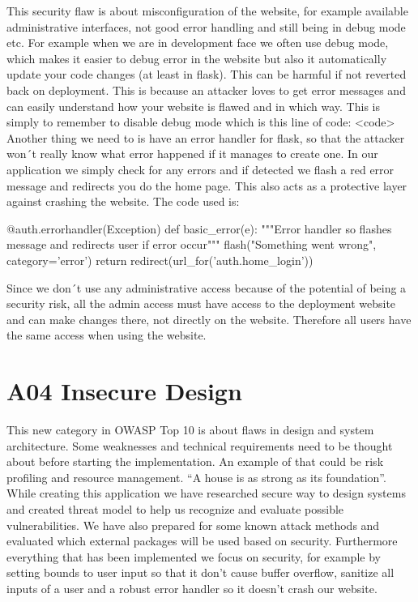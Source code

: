 This security flaw is about misconfiguration of the website, for example available administrative interfaces, not good error handling and still being in debug mode etc.
For example when we are in development face we often use debug mode, which makes it easier to debug error in the website but also it automatically update your code changes (at least in flask). This can be harmful if not reverted back on deployment. This is because an attacker loves to get error messages and can easily understand how your website is flawed and in which way.  This is simply to remember to disable debug mode which is this line of code: <code>
Another thing we need to is have an error handler for flask, so that the attacker won´t really know what error happened if it manages to create one. In our application we simply check for any errors and if detected we flash a red error message and redirects you do the home page. This also acts as a protective layer against crashing the website. The code used is:

\begin{python}
@auth.errorhandler(Exception)
def basic_error(e):
    """Error handler so flashes message
    and redirects user if error occur"""
    flash("Something went wrong", category='error')
    return redirect(url_for('auth.home_login'))
\end{python}

Since we don´t use any administrative access because of the potential of being a security risk, all the admin access must have access to the deployment website and can make changes there, not directly on the website. Therefore all users have the same access when using the website.

\section{A04 Insecure Design}

This new category in OWASP Top 10 is about flaws in design and system architecture. Some weaknesses and technical requirements need to be thought about before starting the implementation. An example of that could be risk profiling and resource management. “A house is as strong as its foundation”. 
While creating this application we have researched secure way to design systems and created threat model to help us recognize and evaluate possible vulnerabilities. We have also prepared for some known attack methods and evaluated which external packages will be used based on security. Furthermore everything that has been implemented we focus on security, for example by setting bounds to user input so that it don’t cause buffer overflow, sanitize all inputs of a user and a robust error handler so it doesn’t crash our website. 

